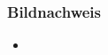 \documentclass{beamer}
\begin{document}












 





















\begin{frame}
\frametitle{Bildnachweis}
\begin{tiny}



 
\begin{itemize}

\item

\end{itemize}
\end{tiny}
\end{frame}
\end{document}
